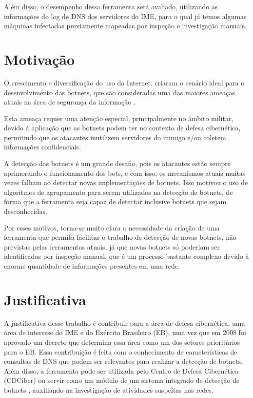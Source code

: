 Além disso, o desempenho dessa ferramenta será avaliado, utilizando as informações do log de DNS dos servidores do IME, para o qual já temos algumas máquinas infectadas previamente mapeadas por inspeção e investigação manuais.

\section{Motivação}
O crescimento e diversificação do uso da Internet, criaram o cenário ideal para o desenvolvimento das botnets, que são consideradas uma das maiores ameaças atuais na área de segurança da informação \citep{ji2008botnet}. 

Esta ameaça requer uma atenção especial, principalmente no âmbito militar, devido à aplicação que as botnets podem ter no contexto de defesa cibernética, permitindo que os atacantes inutilizem servidores do inimigo e/ou coletem informações confidenciais.

A detecção das botnets é um grande desafio, pois os atacantes estão sempre aprimorando o funcionamento dos bots, e com isso, os mecanismos atuais muitas vezes falham ao detectar novas implementações de botnets. Isso motivou o uso de algoritmos de agrupamento para serem utilizados na detecção de botnets, de forma que a ferramenta seja capaz de detectar inclusive botnets que sejam desconhecidas.

Por esses motivos, torna-se muito clara a necessidade da criação de uma ferramenta que permita facilitar o trabalho de detecção de novas botnets, não previstas pelas ferramentas atuais, já que novas botnets só poderiam ser identificadas por inspeção manual, que é um processo bastante complexo devido à enorme quantidade de informações presentes em uma rede.

\section{Justificativa}
A justificativa desse trabalho é contribuir para a área de defesa cibernética, uma área de interesse do IME e do Exército Brasileiro (EB), uma vez que em 2008 foi aprovado um decreto que determina essa área como um dos setores prioritários para o EB. Essa contribuição é feita com o conhecimento de características de consultas de DNS que podem ser relevantes para realizar a detecção de botnets. Além disso, a ferramenta pode ser utilizada pelo Centro de Defesa Cibernética (CDCiber) ou servir como um módulo de um sistema integrado de detecção de botnets \citep{silva2012arquitetura}, auxiliando na investigação de atividades suspeitas nas redes.

